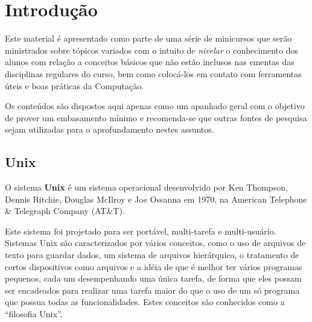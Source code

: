 \documentclass{handout_utfpr}
\begin{document}
\maketitle
\section{Introdução}

Este material é apresentado como parte de uma série de minicursos que serão ministrados sobre tópicos variados com o intuito de \textit{nivelar} o conhecimento dos alunos com relação a conceitos básicos que não estão inclusos nas ementas das disciplinas regulares do curso, bem como colocá-los em contato com ferramentas úteis e boas práticas da Computação.

Os conteúdos são dispostos aqui apenas como um apanhado geral com o objetivo de prover um embasamento mínimo e recomenda-se que outras fontes de pesquisa sejam utilizadas para o aprofundamento nestes assuntos.

\subsection{Unix}
O sistema \textbf{Unix} é um sistema operacional desenvolvido por Ken Thompson, Dennis Ritchie, Douglas McIlroy e Joe Ossanna em 1970, na American Telephone \& Telegraph Company (AT\&T).

Este sistema foi projetado para ser portável, multi-tarefa e multi-usuário. Sistemas Unix são caracterizados por vários conceitos, como o uso de arquivos de texto para guardar dados, um sistema de arquivos hierárquico, o tratamento de certos dispositivos como arquivos e a idéia de que é melhor ter vários programas pequenos, cada um desempenhando uma única tarefa, de forma que eles possam ser encadeados para realizar uma tarefa maior do que o uso de um só programa que possua todas as funcionalidades. Estes conceitos são conhecidos como a ``filosofia Unix''.


\end{document}
